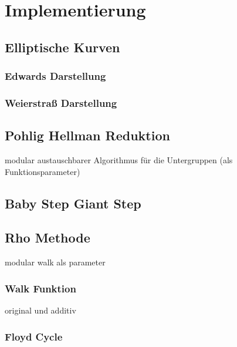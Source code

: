 \documentclass{scrartcl}
\begin{document}
\section{Implementierung}
\label{sec:implementierung}

\subsection{Elliptische Kurven}
\label{sec:elliptische_kurven}

\subsubsection{Edwards Darstellung}
\label{sec:edwards_kurven}

\subsubsection{Weierstraß Darstellung}
\label{sec:weierstrass_kurven}

\subsection{Pohlig Hellman Reduktion}
\label{sec:pohlig_hellman}

modular austauschbarer Algorithmus für die Untergruppen
(als Funktionsparameter)

\cite{Pohlig1978}

\subsection{Baby Step Giant Step}
\label{sec:baby_step_giant_step}

\cite{Galbraith2012}

\subsection{Rho Methode}
\label{sec:rho}

modular walk als parameter

\cite{Galbraith2012}

\subsubsection{Walk Funktion}
\label{sec:walk_funktion}
original und additiv

\subsubsection{Floyd Cycle}
\label{sec:floyd_cycle}
\end{document}
